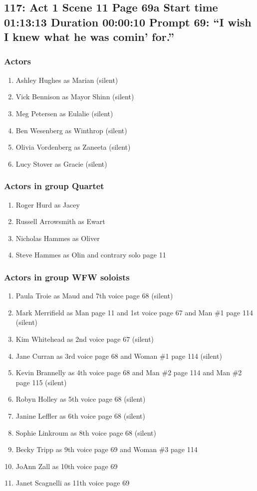 \subsection{117: Act 1 Scene 11 Page 69a Start time 01:13:13 Duration 00:00:10 Prompt 69: ``I wish I knew what he was comin' for.''}

\subsubsection{Actors}
\begin{enumerate}
\item Ashley Hughes as Marian (silent)
\item Vick Bennison as Mayor Shinn (silent)
\item Meg Petersen as Eulalie (silent)
\item Ben Wesenberg as Winthrop (silent)
\item Olivia Vordenberg as Zaneeta (silent)
\item Lucy Stover as Gracie (silent)
\end{enumerate}
\subsubsection{Actors in group Quartet}
\begin{enumerate}
\item Roger Hurd as Jacey
\item Russell Arrowsmith as Ewart
\item Nicholas Hammes as Oliver
\item Steve Hammes as Olin and contrary solo page 11
\end{enumerate}
\subsubsection{Actors in group WFW soloists}
\begin{enumerate}
\item Paula Troie as Maud and 7th voice page 68 (silent)
\item Mark Merrifield as Man page 11 and 1st voice page 67 and Man \#1 page 114 (silent)
\item Kim Whitehead as 2nd voice page 67 (silent)
\item Jane Curran as 3rd voice page 68 and Woman \#1 page 114 (silent)
\item Kevin Brannelly as 4th voice page 68 and Man \#2 page 114 and Man \#2 page 115 (silent)
\item Robyn Holley as 5th voice page 68 (silent)
\item Janine Leffler as 6th voice page 68 (silent)
\item Sophie Linkroum as 8th voice page 68 (silent)
\item Becky Tripp as 9th voice page 69 and Woman \#3 page 114
\item JoAnn Zall as 10th voice page 69
\item Janet Scagnelli as 11th voice page 69
\end{enumerate}

